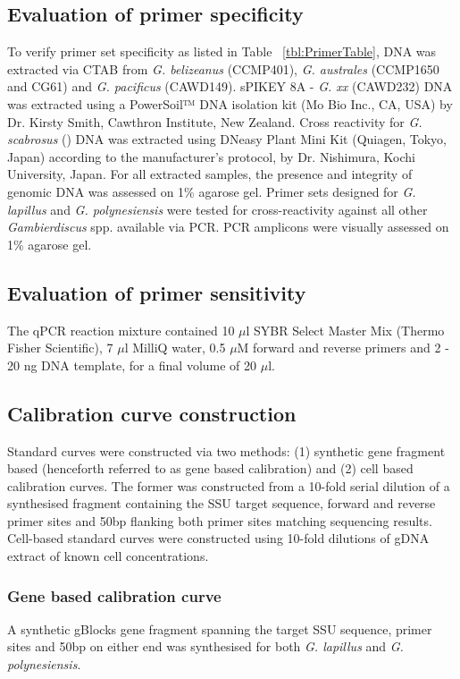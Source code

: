 \documentclass[12pt]{article}
\begin{document}
\subsection{Evaluation of primer specificity}
To verify primer set specificity as listed in Table ~\ref{tbl:PrimerTable}, DNA was extracted via CTAB from \emph{G. belizeanus} (CCMP401), \emph{G. australes} (CCMP1650 and CG61) and \emph{G. pacificus} (CAWD149). sPIKEY 8A - \emph{G. xx} (CAWD232) DNA was extracted using a PowerSoil™ DNA isolation kit (Mo Bio Inc., CA, USA) by Dr. Kirsty Smith, Cawthron Institute, New Zealand. Cross reactivity for \emph{G. scabrosus} () DNA was extracted using DNeasy Plant Mini Kit (Quiagen, Tokyo, Japan) according to the manufacturer's protocol, by Dr. Nishimura, Kochi University, Japan. For all extracted samples, the presence and integrity of genomic DNA was assessed on 1\% agarose gel. Primer sets designed for \emph{G. lapillus} and \emph{G. polynesiensis} were tested for cross-reactivity against all other \emph{Gambierdiscus} spp. available via PCR. PCR amplicons were visually assessed on 1\% agarose gel.
\subsection{Evaluation of primer sensitivity}
The qPCR reaction mixture contained 10 $\mu$l SYBR Select Master Mix (Thermo Fisher Scientific), 7 $\mu$l MilliQ water, 0.5 $\mu$M forward and reverse primers and 2 - 20 ng DNA template, for a final volume of 20 $\mu$l.
\subsection{Calibration curve construction}
Standard curves were constructed via two methods: (1) synthetic gene fragment based (henceforth referred to as gene based calibration) and (2) cell based calibration curves. The former was constructed from a 10-fold serial dilution of a synthesised fragment containing the SSU target sequence, forward and reverse primer sites and 50bp flanking both primer sites matching sequencing results. Cell-based standard curves were constructed using 10-fold dilutions of gDNA extract of known cell concentrations.
\subsubsection{Gene based calibration curve}
A synthetic gBlocks gene fragment spanning the target SSU sequence, primer sites and 50bp on either end was synthesised for both \emph{G. lapillus} and \emph{G. polynesiensis}.
\end{document}
